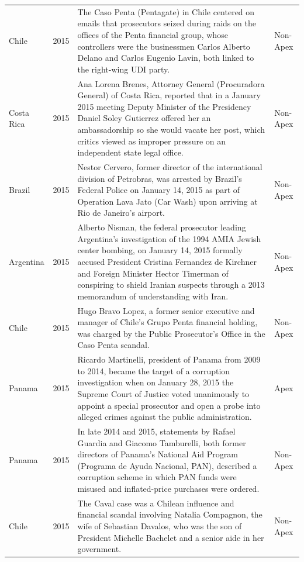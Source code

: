 \begin{landscape}
\begin{longtable}{@{}l c p{15.5cm} l@{}}
Chile & 2015 & The Caso Penta (Pentagate) in Chile centered on emails that prosecutors seized during raids on the offices of the Penta financial group, whose controllers were the businessmen Carlos Alberto Delano and Carlos Eugenio Lavin, both linked to the right-wing UDI party. & Non-Apex \\
Costa Rica & 2015 & Ana Lorena Brenes, Attorney General (Procuradora General) of Costa Rica, reported that in a January 2015 meeting Deputy Minister of the Presidency Daniel Soley Gutierrez offered her an ambassadorship so she would vacate her post, which critics viewed as improper pressure on an independent state legal office. & Non-Apex \\
Brazil & 2015 & Nestor Cervero, former director of the international division of Petrobras, was arrested by Brazil's Federal Police on January 14, 2015 as part of Operation Lava Jato (Car Wash) upon arriving at Rio de Janeiro's airport. & Non-Apex \\
Argentina & 2015 & Alberto Nisman, the federal prosecutor leading Argentina's investigation of the 1994 AMIA Jewish center bombing, on January 14, 2015 formally accused President Cristina Fernandez de Kirchner and Foreign Minister Hector Timerman of conspiring to shield Iranian suspects through a 2013 memorandum of understanding with Iran. & Non-Apex \\
Chile & 2015 & Hugo Bravo Lopez, a former senior executive and manager of Chile's Grupo Penta financial holding, was charged by the Public Prosecutor's Office in the Caso Penta scandal. & Non-Apex \\
Panama & 2015 & Ricardo Martinelli, president of Panama from 2009 to 2014, became the target of a corruption investigation when on January 28, 2015 the Supreme Court of Justice voted unanimously to appoint a special prosecutor and open a probe into alleged crimes against the public administration. & Apex \\
Panama & 2015 & In late 2014 and 2015, statements by Rafael Guardia and Giacomo Tamburelli, both former directors of Panama's National Aid Program (Programa de Ayuda Nacional, PAN), described a corruption scheme in which PAN funds were misused and inflated-price purchases were ordered. & Non-Apex \\
Chile & 2015 & The Caval case was a Chilean influence and financial scandal involving Natalia Compagnon, the wife of Sebastian Davalos, who was the son of President Michelle Bachelet and a senior aide in her government. & Non-Apex \\

\end{longtable}
\end{landscape}
